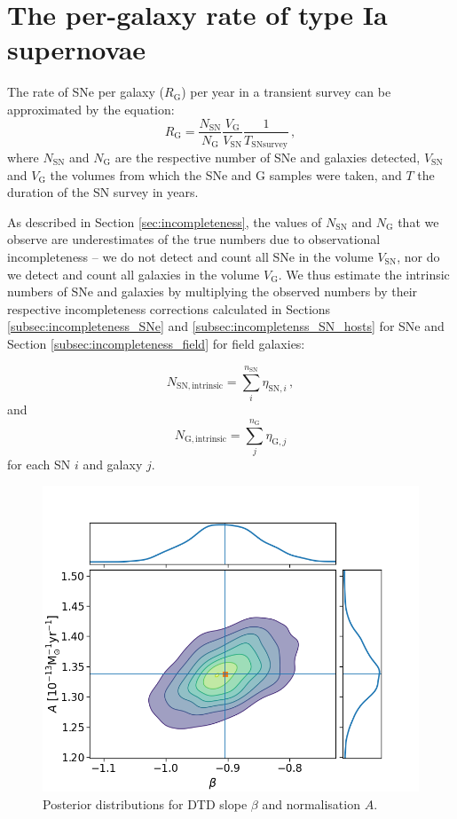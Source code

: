 \documentclass[fleqn,usenatbib]{mnras}
\begin{document}

\section{The per-galaxy rate of type Ia supernovae}
\label{sec:rates}
The rate of SNe per galaxy ($R_{\mathrm{G}}$) per year in a transient survey can be approximated by the equation:
\begin{equation}
    R_{\mathrm{G}} = \frac{N_{\mathrm{SN}}}{N_{\mathrm{G}}} \frac{V_{\mathrm{G}}}{V_{\mathrm{SN}}}\frac{1}{T_{\mathrm{SN  survey}}}\,,
\label{eq:rate1}
\end{equation}
where $N_{\mathrm{SN}}$ and $N_{\mathrm{G}}$ are the respective number of SNe and galaxies detected, $V_{\mathrm{SN}}$ and $V_{\mathrm{G}}$ the volumes from which the SNe and G samples were taken, and $T$ the duration of the SN survey in years. 

As described in Section \ref{sec:incompleteness}, the values of $N_{\mathrm{SN}}$ and $N_{\mathrm{G}}$ that we observe are underestimates of the true numbers due to observational incompleteness -- we do not detect and count all SNe in the volume $V_{\mathrm{SN}}$, nor do we detect and count all galaxies in the volume $V_{\mathrm{G}}$. We thus estimate the intrinsic numbers of SNe and galaxies by multiplying the observed numbers by their respective incompleteness corrections calculated in Sections \ref{subsec:incompleteness_SNe} and \ref{subsec:incompletenss_SN_hosts} for SNe and Section \ref{subsec:incompleteness_field} for field galaxies:

\begin{equation}
    N_{\mathrm{SN,intrinsic}} = \sum_i^{n_{\mathrm{SN}}}\eta_{\mathrm{SN,}i}\,,
    \label{eq:corr_SN}
\end{equation}
and
\begin{equation}
    N_{\mathrm{G,intrinsic}} = \sum_j^{n_{\mathrm{G}}} \eta_{\mathrm{G,}j} 
    \label{eq:corr_G}
\end{equation}
for each SN $i$ and galaxy $j$.

\begin{figure}
    \centering
    \includegraphics[width=.5\textwidth]{figs/beta_A_Qerf1.1_corner.png}
    \caption{Posterior distributions for DTD slope $\beta$ and normalisation $A$. %
    \label{fig:corner_beta_norm}}
\end{figure}
\end{document}
